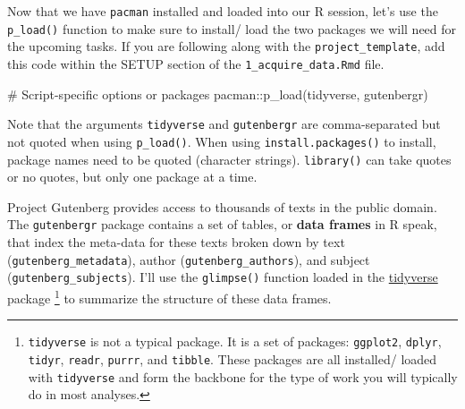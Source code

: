 \documentclass[
  letterpaper,
]{latex/krantz}
\newenvironment{Shaded}{\begin{snugshade}}{\end{snugshade}}
\newcommand{\CommentTok}[1]{\textcolor[rgb]{0.37,0.37,0.37}{#1}}
\newcommand{\FunctionTok}[1]{\textcolor[rgb]{0.28,0.35,0.67}{#1}}
\newcommand{\NormalTok}[1]{\textcolor[rgb]{0.00,0.23,0.31}{#1}}
\newcommand{\SpecialCharTok}[1]{\textcolor[rgb]{0.37,0.37,0.37}{#1}}
\begin{document}
Now that we have \texttt{pacman} installed and loaded into our R
session, let's use the \texttt{p\_load()} function to make sure to
install/ load the two packages we will need for the upcoming tasks. If
you are following along with the \texttt{project\_template}, add this
code within the SETUP section of the \texttt{1\_acquire\_data.Rmd} file.

\begin{Shaded}
\begin{Highlighting}[]
\CommentTok{\# Script{-}specific options or packages}
\NormalTok{pacman}\SpecialCharTok{::}\FunctionTok{p\_load}\NormalTok{(tidyverse, gutenbergr)}
\end{Highlighting}
\end{Shaded}

\begin{tcolorbox}[enhanced jigsaw, opacitybacktitle=0.6, breakable, colframe=quarto-callout-warning-color-frame, arc=.35mm, left=2mm, leftrule=.75mm, title=\textcolor{quarto-callout-warning-color}{\faExclamationTriangle}\hspace{0.5em}{Tip}, opacityback=0, colback=white, toptitle=1mm, rightrule=.15mm, titlerule=0mm, bottomtitle=1mm, bottomrule=.15mm, coltitle=black, colbacktitle=quarto-callout-warning-color!10!white, toprule=.15mm]
Note that the arguments \texttt{tidyverse} and \texttt{gutenbergr} are
comma-separated but not quoted when using \texttt{p\_load()}. When using
\texttt{install.packages()} to install, package names need to be quoted
(character strings). \texttt{library()} can take quotes or no quotes,
but only one package at a time.
\end{tcolorbox}

Project Gutenberg provides access to thousands of texts in the public
domain. The \texttt{gutenbergr} package contains a set of tables, or
\textbf{data frames} in R speak, that index the meta-data for these
texts broken down by text (\texttt{gutenberg\_metadata}), author
(\texttt{gutenberg\_authors}), and subject
(\texttt{gutenberg\_subjects}). I'll use the \texttt{glimpse()} function
loaded in the
\href{https://CRAN.R-project.org/package=tidyverse}{tidyverse} package
\footnote{\texttt{tidyverse} is not a typical package. It is a set of
  packages: \texttt{ggplot2}, \texttt{dplyr}, \texttt{tidyr},
  \texttt{readr}, \texttt{purrr}, and \texttt{tibble}. These packages
  are all installed/ loaded with \texttt{tidyverse} and form the
  backbone for the type of work you will typically do in most analyses.}
to summarize the structure of these data frames.
\end{document}
